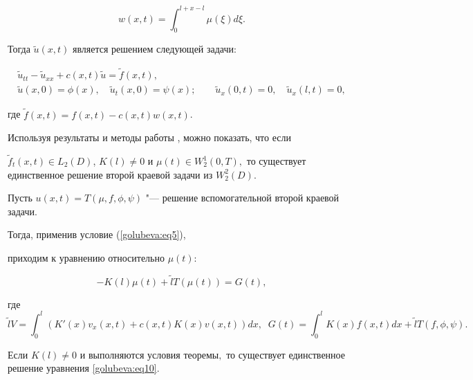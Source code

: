 $$

w(x, t)=\int _{0}^{l+x-l}\mu (\xi )d\xi.

$$

Тогда $\tilde {u}(x, t)$ является решением следующей задачи:

\begin{gather*}

\tilde {u} _{tt}-\tilde {u} _{xx}+c(x, t)\tilde {u} =\tilde {f} (x, t),\\

\tilde {u}(x, 0)=\phi (x),\quad 

\tilde {u} _{t}(x, 0)=\psi (x);\qquad 

\tilde {u} _{x}(0, t)=0,\quad 

\tilde {u} _{x}(l, t)=0,

\end{gather*}

где  $\tilde {f} (x, t)=f(x, t)-c(x, t)w(x, t)$.



Используя результаты и методы работы \cite{golubeva:bib2}, можно показать, что если

$\tilde {f}_{t}(x, t)\in L_{2}(D)$, $K(l)\ne0$ и $\mu (t)\in W_{2}^{1}(0, T),$ то существует единственное решение второй краевой задачи из $W_{2}^{2}(D).$



 Пусть $u(x, t)=T(\mu , f, \phi , \psi )$ "--- решение вспомогательной второй краевой задачи. 

 Тогда, применив условие (\ref{golubeva:eq5}),

 приходим к  уравнению относительно $\mu (t)$:

\begin{equation}

\label{golubeva:eq10}

-K(l)\mu (t)+\tilde{l}T(\mu (t))=G(t),

\end{equation}

где $$\tilde{l}V=\int _{0}^{l}(K'(x)v_{x}(x, t)+c(x, t)K(x)v(x, t))dx,

\;  \;

G(t)=\int _{0}^{l}K(x)f(x, t)dx+\tilde{l}T(f, \phi , \psi ).

$$



\begin{lemma}

Если $K(l)\ne0$ и выполняются условия теоремы$,$ то существует единственное решение уравнения \rm \eqref{golubeva:eq10}.

\end{lemma}



